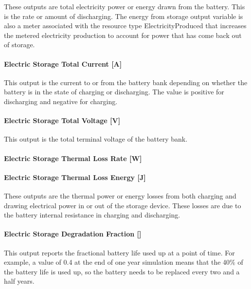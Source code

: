 These outputs are total electricity power or energy drawn from the battery. This is the rate or amount of discharging. The energy from storage output variable is also a meter associated with the resource type ElectricityProduced that increases the metered electricity production to account for power that has come back out of storage.

\paragraph{Electric Storage Total Current {[}A{]}}\label{electric-storage-total-current-a}

This output is the current to or from the battery bank depending on whether the battery is in the state of charging or discharging. The value is positive for discharging and negative for charging.

\paragraph{Electric Storage Total Voltage {[}V{]}}\label{electric-storage-total-voltage-v}

This output is the total terminal voltage of the battery bank.

\paragraph{Electric Storage Thermal Loss Rate {[}W{]}}\label{electric-storage-thermal-loss-rate-w-1}

\paragraph{Electric Storage Thermal Loss Energy {[}J{]}}\label{electric-storage-thermal-loss-energy-j-1}

These outputs are the thermal power or energy losses from both charging and drawing electrical power in or out of the storage device. These losses are due to the battery internal resistance in charging and discharging.

\paragraph{Electric Storage Degradation Fraction {[]}}\label{electric-storage-degradation-fraction}

This output reports the fractional battery life used up at a point of time. For example, a value of 0.4 at the end of one year simulation means that the 40\% of the battery life is used up, so the battery needs to be replaced every two and a half years.

